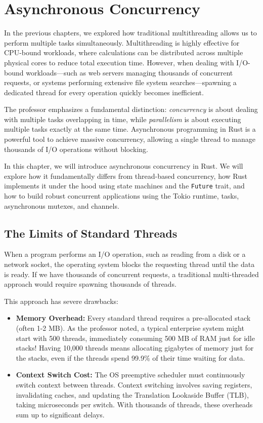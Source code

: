 \chapter{Asynchronous Concurrency}

In the previous chapters, we explored how traditional multithreading allows us to perform multiple tasks simultaneously. Multithreading is highly effective for CPU-bound workloads, where calculations can be distributed across multiple physical cores to reduce total execution time. However, when dealing with I/O-bound workloads---such as web servers managing thousands of concurrent requests, or systems performing extensive file system searches---spawning a dedicated thread for every operation quickly becomes inefficient.

The professor emphasizes a fundamental distinction: \textit{concurrency} is about dealing with multiple tasks overlapping in time, while \textit{parallelism} is about executing multiple tasks exactly at the same time. Asynchronous programming in Rust is a powerful tool to achieve massive concurrency, allowing a single thread to manage thousands of I/O operations without blocking.

In this chapter, we will introduce asynchronous concurrency in Rust. We will explore how it fundamentally differs from thread-based concurrency, how Rust implements it under the hood using state machines and the \texttt{Future} trait, and how to build robust concurrent applications using the Tokio runtime, tasks, asynchronous mutexes, and channels.

\section{The Limits of Standard Threads}

When a program performs an I/O operation, such as reading from a disk or a network socket, the operating system blocks the requesting thread until the data is ready. If we have thousands of concurrent requests, a traditional multi-threaded approach would require spawning thousands of threads. 

This approach has severe drawbacks:
\begin{itemize}
    \item \textbf{Memory Overhead:} Every standard thread requires a pre-allocated stack (often 1-2 MB). As the professor noted, a typical enterprise system might start with 500 threads, immediately consuming 500 MB of RAM just for idle stacks! Having 10,000 threads means allocating gigabytes of memory just for the stacks, even if the threads spend 99.9\% of their time waiting for data.
    \item \textbf{Context Switch Cost:} The OS preemptive scheduler must continuously switch context between threads. Context switching involves saving registers, invalidating caches, and updating the Translation Lookaside Buffer (TLB), taking microseconds per switch. With thousands of threads, these overheads sum up to significant delays.
\end{itemize}

